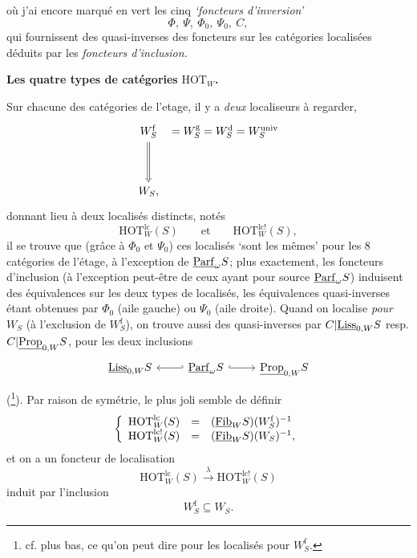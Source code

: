 

où j'ai encore marqué en vert les cinq \textit{`foncteurs d'inversion'}
\[
\Phi,\ \Psi,\ \Phi_0,\ \Psi_0,\ C,
\]
qui fournissent des quasi-inverses des foncteurs sur les catégories localisées déduits par les \textit{foncteurs d'inclusion.}

 \textbf{Les quatre types de catégories} $\mathrm{HOT}_W$\textbf{.}

Sur chacune des catégories de l'etage, il y a \textit{deux} localiseurs à regarder, %
\[
\begin{tikzcd}[row sep=huge, column sep=0pt]
W_S^{\mathrm{f}} \arrow[d, Rightarrow] & {} = W_S^{\mathrm{g}} = W_S^{\mathrm{d}} = W_S^{\mathrm{univ}} \\
W_S, &
\end{tikzcd}
\]
donnant lieu à deux localisés distincts, notés
\[
\mathrm{HOT}^{\mathrm{lc}}_W(S) \qquad \text{et} \qquad \mathrm{HOT}^{\mathrm{lc}!}_W(S),
\]
il se trouve que (grâce à $\Phi_0$ et $\Psi_0$) ces localisés `sont les mêmes' pour les 8 catégories de l'étage, à l'exception de $\underline{\mathrm{Parf}}_\omega S$; plus exactement, les foncteurs d'inclusion (à l'exception peut-être de ceux ayant pour source $\underline{\mathrm{Parf}}_\omega S$) induisent des équivalences sur les deux types de localisés, les équivalences quasi-inverses étant obtenues par $\Phi_0$ (aile gauche) ou $\Psi_0$ (aile droite). Quand on localise \textit{pour} $W_S$ (à l'exclusion de $W_S^{\mathrm{f}}$), on trouve aussi des quasi-inverses par $C|\underline{\mathrm{Liss}}_{0,W} S$ resp. $C|\underline{\mathrm{Prop}}_{0,W} S$, pour les deux inclusions
\[
\begin{tikzcd}
\ul{Liss}_{0,W} S & \ul{Parf}_\omega S \arrow[l, hook'] \arrow[r, hook] & \ul{Prop}_{0,W} S
\end{tikzcd}
\]
(\footnote{cf. plus bas, ce qu'on peut dire pour les localisés pour $W_S^{\mathrm{f}}$.}). Par raison de symétrie, le plus joli semble de définir
\[
\left\{
\begin{array}{lcl}
\mathrm{HOT}^{\mathrm{lc}}_W(S) & = & (\underline{\mathrm{Fib}}_W S)(W_S^{\mathrm{f}})^{-1}\\
\mathrm{HOT}^{\mathrm{lc}!}_W(S) & = & (\underline{\mathrm{Fib}}_W S)(W_S)^{-1},
\end{array}
\right.
\]
et on a un foncteur de localisation
\[
\mathrm{HOT}^{\mathrm{lc}}_W(S) \xrightarrow{\ \lambda\ } \mathrm{HOT}^{\mathrm{lc}!}_W(S)
\]
induit par l'inclusion
\[
W_S^{\mathrm{f}} \subseteq W_S.
\]

